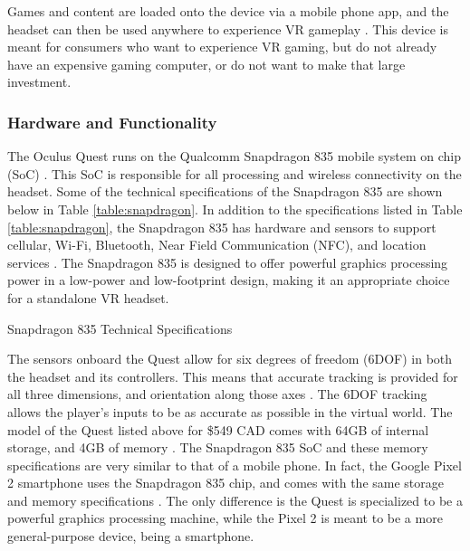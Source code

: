 Games and content are loaded onto the device via a mobile phone app, 
and the headset can then be used anywhere to experience VR gameplay \cite{quest_features}. 
This device is meant for consumers who want to experience VR gaming, 
but do not already have an expensive gaming computer, or do not want 
to make that large investment.

\subsubsection{Hardware and Functionality}
The Oculus Quest runs on the Qualcomm Snapdragon 835 mobile system on chip (SoC) \cite{oculus_dev_page}.
This SoC is responsible for all processing and wireless connectivity on the headset. Some 
of the technical specifications of the Snapdragon 835 are shown
below in Table \ref{table:snapdragon}. In addition to the specifications listed in Table
\ref{table:snapdragon}, the Snapdragon 835 has hardware and sensors to support
cellular, Wi-Fi, Bluetooth, Near Field Communication (NFC), and location services
\cite{snapdragon_835}. The Snapdragon 835 is designed to offer powerful graphics
processing power in a low-power and low-footprint design, making it an appropriate
choice for a standalone VR headset.

\begin{table}[h]
    \centering
    \caption{Snapdragon 835 Technical Specifications}
    \label{table:snapdragon} 
\end{table}

The sensors onboard the Quest allow for six degrees of freedom (6DOF) in both the headset
and its controllers. This means that accurate tracking is provided for all three dimensions,
and orientation along those axes \cite{sixdof_defn}. The 6DOF tracking allows the player's
inputs to be as accurate as possible in the virtual world. The model of the Quest 
listed above for \$549 CAD comes with 64GB of internal storage, and 4GB of memory
\cite{quest_timemag}. The Snapdragon 835 SoC and these memory specifications
are very similar to that of a mobile phone. In fact, the Google Pixel 2 smartphone
uses the Snapdragon 835 chip, and comes with the same storage and memory
specifications \cite{quest_polygon}. The only difference is the Quest is
specialized to be a powerful graphics processing machine, while the Pixel 2
is meant to be a more general-purpose device, being a smartphone.

